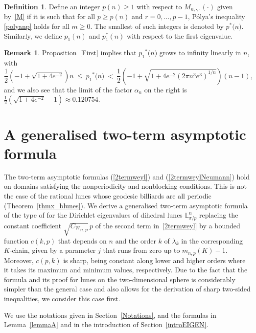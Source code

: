 \documentclass[11pt,a4paper,times]{amsart}
\theoremstyle{plain}
\theoremstyle{definition}
\newtheorem{definition}[thm]{Definition}%
\newtheorem{remark}{Remark}[section]
\numberwithin{equation}{section}
\newcommand{\ds}{\displaystyle}
\newcommand{\Cw}{{ C_W}}
\newcommand{\fr}[2]{\frac{\ds #1}{\ds #2}}
\newcommand{\pn}{p(n)}
\newcommand{\pin}[1]{p^*{#1}}
\newcommand{\pione}[1]{{p_1\!\!}^*{#1}}
\newcommand{\lune}[2]{\mathbb{L}^{#1}_{#2}}
\newcommand{\txtg}{\textcolor{green}}
\begin{document}
{\begin{definition}\label{DEF5.2} Define an integer $\pn\geq 1$ with respect to $M_{n,\cdot,\cdot}(\cdot)$ given by~\eqref{M} if it is such that for all $p\geq \pn$ and  $r=0, \ldots,p-1$,  P\'{o}lya's inequality \eqref{polyanp} holds for all $m\geq 0$. The smallest of such integers is denoted by $\pin(n)$. Similarly, we define $p_1(n)$ and $p_1^*(n)$ with respect to the first eigenvalue.
\end{definition}
\begin{remark}
Proposition~\ref{First} implies that $\pione(n)$ grows to infinity linearly in $n$, with
 \[\fr{1}{2}\left(-1+\sqrt{1+4e^{-2}}\right)n~\leq ~\pione(n) ~< ~\fr{1}{2}\left(-1+\sqrt{1+4e^{-2}(2\pi n^3e^3)^{1/n}}\right)(n-1),\]
 and we also see that the limit
 of the factor $\alpha_{n}$ on the right is
 $ \fr{1}{2}\left( \sqrt {1 + 4e^{-2}} - 1 \right)\approx 0.120754.$
\end{remark}

\section{A generalised two-term asymptotic formula\label{Sec Third term}}
The two-term asymptotic formulas (\ref {2termweyl}) and  (\ref{2termweylNeumann}) hold on domains satisfying the nonperiodicity and nonblocking
conditions. This is not the case of the  rational lunes whose geodesic billiards    are all periodic (Theorem~\ref{thmx_blunes}).
We derive {a generalised two-term} asymptotic formula of the type of  \cite[1.7.1]{sava} for the Dirichlet eigenvalues of  dihedral lunes $\lune{n}{\pi/p}$
replacing the constant coefficient $\sqrt{\Cw_{n,p}}\,p$ of the second term in~\eqref {2termweyl} by a  bounded function  $c(k,p)$
that depends on $n$ and the order  $k$ of $\lambda_k$ in the corresponding $K$-chain,  given by a  parameter $j$ that runs from  zero up to $m_{n,p}
(K)-1$. Moreover, $c(p,k)$  is sharp, being constant along lower and higher  orders where it takes its maximum and minimum values, respectively.
Due to the fact that the formula and its proof for lunes on the two-dimensional sphere is considerably simpler than the general case
and also allows for the derivation of sharp two-sided inequalities, we consider this case first.

We use the notations given in Section~\ref{Notations}, and the formulas in  Lemma~\ref{lemmaA} and in the introduction of  Section~\ref{introEIGEN}.

}
\end{document}
